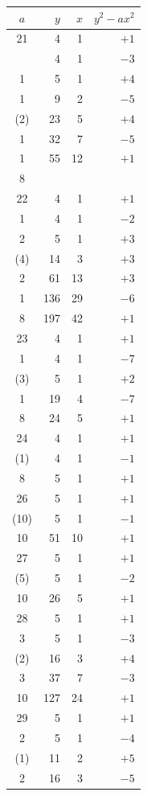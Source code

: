 \documentclass[11pt]{article}
\begin{document}
\begin{center}
\renewcommand{\arraystretch}{1.05}
\begin{tabular}{|c|r|r|r|}
\hline
$a$ & $y$ & $x$ & $y^2 - ax^2$ \\
\hline
21 & 4 & 1 & $+1$ \\
 & 4 & 1 & $-3$ \\
1 & 5 & 1 & $+4$ \\
1 & 9 & 2 & $-5$ \\
(2) & 23 & 5 & $+4$ \\
1 & 32 & 7 & $-5$ \\
1 & 55 & 12 & $+1$ \\
8 & & & \\
\hline
22 & 4 & 1 & $+1$ \\
1 & 4 & 1 & $-2$ \\
2 & 5 & 1 & $+3$ \\
(4) & 14 & 3 & $+3$ \\
2 & 61 & 13 & $+3$ \\
1 & 136 & 29 & $-6$ \\
8 & 197 & 42 & $+1$ \\
\hline
23 & 4 & 1 & $+1$ \\
1 & 4 & 1 & $-7$ \\
(3) & 5 & 1 & $+2$ \\
1 & 19 & 4 & $-7$ \\
8 & 24 & 5 & $+1$ \\
\hline
24 & 4 & 1 & $+1$ \\
(1) & 4 & 1 & $-1$ \\
8 & 5 & 1 & $+1$ \\
\hline
26 & 5 & 1 & $+1$ \\
(10) & 5 & 1 & $-1$ \\
10 & 51 & 10 & $+1$ \\
\hline
27 & 5 & 1 & $+1$ \\
(5) & 5 & 1 & $-2$ \\
10 & 26 & 5 & $+1$ \\
\hline
28 & 5 & 1 & $+1$ \\
3 & 5 & 1 & $-3$ \\
(2) & 16 & 3 & $+4$ \\
3 & 37 & 7 & $-3$ \\
10 & 127 & 24 & $+1$ \\
\hline
29 & 5 & 1 & $+1$ \\
2 & 5 & 1 & $-4$ \\
(1) & 11 & 2 & $+5$ \\
2 & 16 & 3 & $-5$ \\

\end{tabular}
\end{center}
\end{document}
